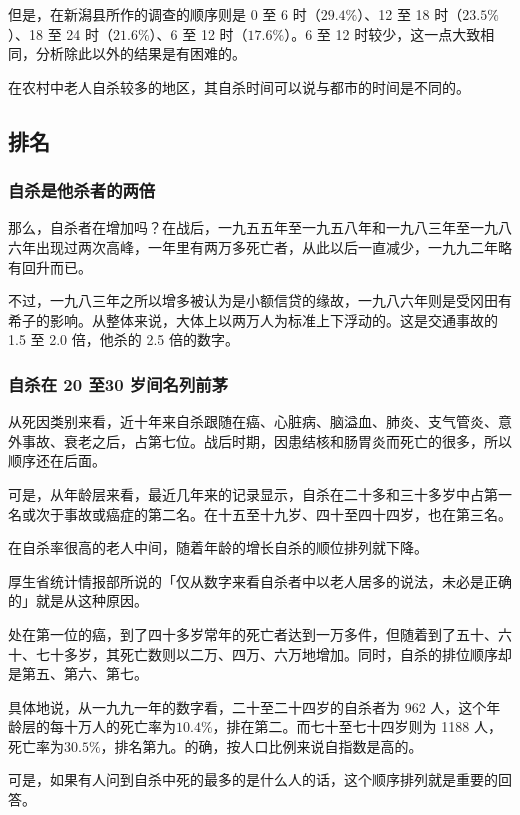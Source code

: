 \documentclass[UTF8]{ctexart}
\begin{document}
但是，在新潟县所作的调查的顺序则是 0 至 6 时（$29.4\%$）、12 至 18 时（$23.5\%$）、18 至 24 时（$21.6\%$）、6 至 12 时（$17.6\%$）。6 至 12 时较少，这一点大致相同，分析除此以外的结果是有困难的。

在农村中老人自杀较多的地区，其自杀时间可以说与都市的时间是不同的。

\subsection{排名}

\subsubsection*{自杀是他杀者的两倍}

那么，自杀者在增加吗？在战后，一九五五年至一九五八年和一九八三年至一九八六年出现过两次高峰，一年里有两万多死亡者，从此以后一直减少，一九九二年略有回升而已。

不过，一九八三年之所以增多被认为是小额信贷的缘故，一九八六年则是受冈田有希子的影响。从整体来说，大体上以两万人为标准上下浮动的。这是交通事故的 1.5 至 2.0 倍，他杀的 2.5 倍的数字。

\subsubsection*{自杀在 20 至30 岁间名列前茅}

从死因类别来看，近十年来自杀跟随在癌、心脏病、脑溢血、肺炎、支气管炎、意外事故、衰老之后，占第七位。战后时期，因患结核和肠胃炎而死亡的很多，所以顺序还在后面。

可是，从年龄层来看，最近几年来的记录显示，自杀在二十多和三十多岁中占第一名或次于事故或癌症的第二名。在十五至十九岁、四十至四十四岁，也在第三名。

在自杀率很高的老人中间，随着年龄的增长自杀的顺位排列就下降。

厚生省统计情报部所说的「仅从数字来看自杀者中以老人居多的说法，未必是正确的」就是从这种原因。

处在第一位的癌，到了四十多岁常年的死亡者达到一万多件，但随着到了五十、六十、七十多岁，其死亡数则以二万、四万、六万地增加。同时，自杀的排位顺序却是第五、第六、第七。

具体地说，从一九九一年的数字看，二十至二十四岁的自杀者为 962 人，这个年龄层的每十万人的死亡率为$10.4\%$，排在第二。而七十至七十四岁则为 1188 人，死亡率为$30.5\%$，排名第九。的确，按人口比例来说自指数是高的。

可是，如果有人问到自杀中死的最多的是什么人的话，这个顺序排列就是重要的回答。
\end{document}
